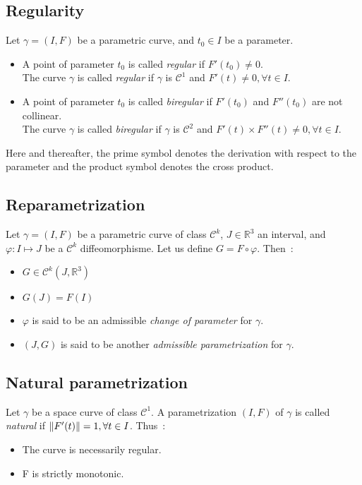 \subsection{Regularity}
Let $\gamma=(I,F)$ be a parametric curve, and $t_0 \in I$ be a parameter.
\begin{itemize}
	\item A point of parameter $t_0$ is called \emph{regular} if $F'(t_0) \neq 0$.
	\\The curve $\gamma$ is called \emph{regular} if $\gamma$ is $\mathcal{C}^{1}$ and $F'(t) \neq 0, \forall t \in I$.
	\item A point of parameter $t_0$ is called \emph{biregular} if $F'(t_0)$ and $F''(t_0)$ are not collinear.
	\\The curve $\gamma$ is called \emph{biregular} if $\gamma$ is $\mathcal{C}^{2}$ and  $F'(t) \times F''(t) \neq 0, \forall t \in I$.
\end{itemize}
Here and thereafter, the prime symbol denotes the derivation with respect to the parameter and the product symbol denotes the cross product.
\subsection{Reparametrization}
Let $\gamma=(I,F)$ be a parametric curve of class ${\mathcal{C}}^{k}$, $J \in {\mathbb{R}}^{3}$ an interval, and $\varphi\colon I\mapsto J$ be a ${\mathcal{C}}^{k}$ diffeomorphisme. Let us define $G=F\circ\varphi$. Then~:
\begin{itemize}
	\item $G\in{\mathcal{C}}^{k}(J,{\mathbb{R}}^3)$
	\item $G(J)=F(I)$
	\item $\varphi$ is said to be an admissible \emph{change of parameter} for $\gamma$.
	\item  $(J,G)$ is said to be another \emph{admissible parametrization} for $\gamma$.
\end{itemize}

\subsection{Natural parametrization}
Let $\gamma$ be a space curve of class ${\mathcal{C}}^{1}$. A parametrization $(I,F)$ of $\gamma$ is called \emph{natural} if $\lVert F'(t)\rVert = 1, \forall t \in I$. Thus~:
\begin{itemize}
	\item The curve is necessarily regular.
	\item F is strictly monotonic.
\end{itemize}

